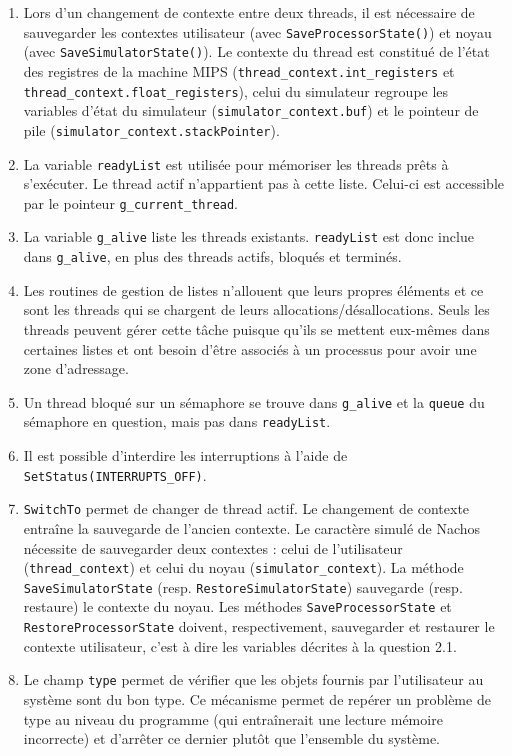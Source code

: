 \documentclass{article}
\begin{document}
\begin{enumerate}
\item Lors d'un changement de contexte entre deux threads, il est nécessaire de sauvegarder les contextes utilisateur (avec {\tt SaveProcessorState()}) et noyau (avec {\tt SaveSimulatorState()}). Le contexte du thread est constitué de l'état des registres de la machine MIPS (\texttt{thread\_context.int\_registers} et \texttt{thread\_context.float\_registers}), celui du simulateur regroupe les variables d'état du simulateur (\texttt{simulator\_context.buf}) et le pointeur de pile (\texttt{simulator\_context.stackPointer}).
\item La variable {\tt readyList} est utilisée pour mémoriser les threads prêts à s'exécuter. Le thread actif n'appartient pas à cette liste. Celui-ci est accessible par le pointeur {\tt g\_current\_thread}.
\item La variable {\tt g\_alive} liste les threads existants. {\tt readyList} est donc inclue dans {\tt g\_alive}, en plus des threads actifs, bloqués et terminés.
\item Les routines de gestion de listes n'allouent que leurs propres éléments et ce sont les threads qui se chargent de leurs allocations/désallocations. Seuls les threads peuvent gérer cette tâche puisque qu'ils se mettent eux-mêmes dans certaines listes et ont besoin d'être associés à un processus pour avoir une zone d'adressage.
\item Un thread bloqué sur un sémaphore se trouve dans {\tt g\_alive} et la {\tt queue} du sémaphore en question, mais pas dans {\tt readyList}.
\item Il est possible d'interdire les interruptions à l'aide de \texttt{SetStatus(INTERRUPTS\_OFF)}.
\item {\tt SwitchTo} permet de changer de thread actif. Le changement de contexte entraîne la sauvegarde de l'ancien contexte. Le caractère simulé de Nachos nécessite de sauvegarder deux contextes : celui de l'utilisateur (\texttt{thread\_context}) et celui du noyau (\texttt{simulator\_context}). La méthode \texttt{SaveSimulatorState} (resp. \texttt{RestoreSimulatorState}) sauvegarde (resp. restaure) le contexte du noyau. Les méthodes \texttt{SaveProcessorState} et \texttt{RestoreProcessorState} doivent, respectivement, sauvegarder et restaurer le contexte utilisateur, c'est à dire les variables décrites à la question 2.1.
\item Le champ \texttt{type} permet de vérifier que les objets fournis par l'utilisateur au système sont du bon type. Ce mécanisme permet de repérer un problème de type au niveau du programme (qui entraînerait une lecture mémoire incorrecte) et d'arrêter ce dernier plutôt que l'ensemble du système.
\end{enumerate}
\end{document}
